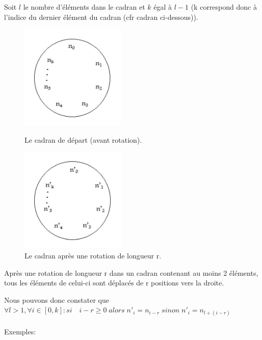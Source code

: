 	Soit $l$ le nombre d’éléments dans le cadran et $k$ égal à $l-1$ (k correspond donc à l’indice du dernier élément du cadran (cfr cadran ci-dessous)).
	
	\begin{figure}[h]
		\centering
		\parbox{5cm}{
			\includegraphics[height=5cm]{1}
			\caption{Le cadran de départ (avant rotation).}
			\label{fig:2figsA}}
		\qquad
		\begin{minipage}{5cm}
			\includegraphics[height=5cm]{2}
			\caption{Le cadran après une rotation de longueur r.}
			\label{fig:2figsB}
		\end{minipage}
	\end{figure}
	
	Après une rotation de longueur r dans un cadran contenant au moins 2 éléments, tous les éléments de celui-ci sont déplacés de r positions vers la droite.
	
	Nous pouvons donc constater que $ \forall l > 1, \forall i \in [0,k]: si\quad i-r \geq 0 \; alors \; n'_i = n_{i-r} \; sinon \; n'_i = n_{l+(i-r)}$
	\\\\
	Exemples:

